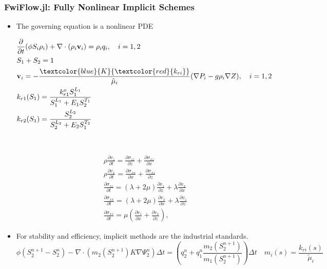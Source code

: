 \documentclass[usenames,dvipsnames]{beamer}
\begin{document}
\begin{frame}
\frametitle{FwiFlow.jl: Fully Nonlinear Implicit Schemes}
\begin{itemize}
	\item The governing equation is a nonlinear PDE
\begin{minipage}[b]{0.48\textwidth}
{\scriptsize
	\begin{align*}
	&\frac{\partial }{{\partial t}}(\phi {{S_i}}{\rho _i}) + \nabla  \cdot ({\rho _i}{\mathbf{v}_i}) = {\rho _i}{q_i},\quad 
      i = 1,2	\\
     & S_{1} + S_{2} = 1\\
      &{\mathbf{v}_i} = - \frac{{\textcolor{blue}{K}{\textcolor{red}{k_{ri}}}}}{{{\tilde{\mu}_i}}}(\nabla {P_i} - g{\rho _i}\nabla Z), \quad
      i=1, 2\\
	&k_{r1}(S_1) = \frac{k_{r1}^o S_1^{L_1}}{S_1^{L_1} + E_1 S_2^{T_1}}\\
	&k_{r2}(S_1) = \frac{ S_2^{L_2}}{S_2^{L_2} + E_2 S_1^{T_2}}
	\end{align*}
	}
\end{minipage}~\vline
\begin{minipage}[b]{0.48\textwidth}
\flushleft
	{\scriptsize \begin{eqnarray*}
 && \rho \frac{\partial v_z}{\partial t} = \frac{\partial \sigma_{zz}}{\partial z} + \frac{\partial \sigma_{xz}}{\partial x} \nonumber \\
 && \rho \frac{\partial v_x}{\partial t} = \frac{\partial \sigma_{xx}}{\partial x} + \frac{\partial \sigma_{xz}}{\partial z} \nonumber \\
 && \frac{\partial \sigma_{zz}}{\partial t} = (\lambda + 2\mu)\frac{\partial v_z}{\partial z} + \lambda\frac{\partial v_x}{\partial x} \nonumber \\
 && \frac{\partial \sigma_{xx}}{\partial t} = (\lambda + 2\mu)\frac{\partial v_x}{\partial x} + \lambda\frac{\partial v_z}{\partial z} \nonumber \\
 && \frac{\partial \sigma_{xz}}{\partial t} = \mu (\frac{\partial v_z}{\partial x} + \frac{\partial v_x}{\partial z}),
\end{eqnarray*}}
\end{minipage}

	\item For stability and efficiency, implicit methods are the industrial standards. 
{\scriptsize	$$\phi (S_2^{n + 1} - S_2^n) - \nabla \cdot \left( {{m_{2}}(S_2^{n + 1})K\nabla \Psi _2^n} \right) \Delta t = 
\left(q_2^n + q_1^n \frac{m_2(S^{n+1}_2)}{m_1(S^{n+1}_2)}\right) 
\Delta t\quad m_i(s) = \frac{k_{ri}(s)}{\tilde \mu_i}
$$} 
\end{itemize}

\end{frame}
\end{document}
